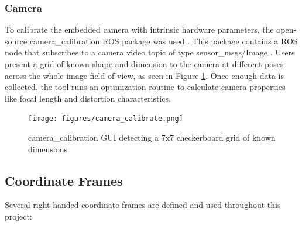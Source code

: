 \subsubsection{ Camera }
To calibrate the embedded camera with intrinsic hardware parameters, the open-source camera\_calibration ROS package was used \cite{cameracalibration}. This package contains a ROS node that subscribes to a camera video topic of type sensor\_msgs/Image \cite{imagemsg}. Users present a grid of known shape and dimension to the camera at different poses across the whole image field of view, as seen in Figure \ref{fig:camera_calibrate}. Once enough data is collected, the tool runs an optimization routine to calculate camera properties like focal length and distortion characteristics.

\begin{figure}[H]
    \centerline{\texttt{[image: figures/camera\_calibrate.png]}}
    \caption{ camera\_calibration GUI detecting a 7x7 checkerboard grid of known dimensions}
    \label{fig:camera_calibrate}
\end{figure}


\subsection{ Coordinate Frames }

Several right-handed coordinate frames are defined and used throughout this project:

